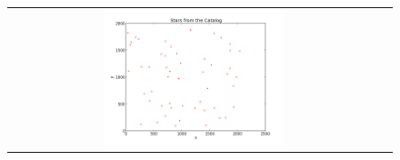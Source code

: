 \documentclass[letterpaper,12pt]{article}
\begin{document}
\begin{figure}[h!]
\begin{tabular}{cc}
                                                                                                                                                                                                                                                                                                                                                                                                                                                                                                                                                                                                                                                                                                                                                                                                                                   \includegraphics[width=0.5\textwidth]{star_catalogue.png} 

\end{tabular}
\end{figure}
\end{document}
